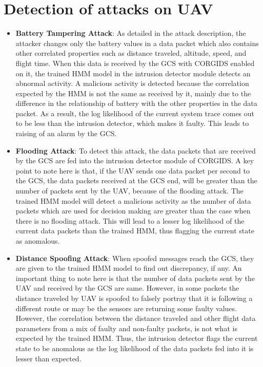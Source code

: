 \section{Detection of attacks on UAV}
\begin{itemize}
\item {\bf Battery Tampering Attack}: As detailed in the attack description, the attacker changes only the battery values in a data packet which also contains other correlated properties such as distance traveled, altitude, speed, and flight time. When this data is received by the GCS with CORGIDS enabled on it, the trained HMM model in the intrusion detector module detects an abnormal activity. A malicious activity is detected because the correlation expected by the HMM is not the same as received by it, mainly due to the difference in the relationship of battery with the other properties in the data packet. As a result, the log likelihood of the current system trace comes out to be less than the intrusion detector, which makes it faulty. This leads to raising of an alarm by the GCS.

\item {\bf Flooding Attack}: To detect this attack, the data packets that are received by the GCS are fed into the intrusion detector module of CORGIDS. A key point to note here is that, if the UAV sends one data packet per second to the GCS, the data packets received at the GCS end, will be greater than the number of packets sent by the UAV, because of the flooding attack. The trained HMM model will detect a malicious activity as the number of data packets which are used for decision making are greater than the case when there is no flooding attack. This will lead to a lesser log likelihood of the current data packets than the trained HMM, thus flagging the current state as anomalous.

\item {\bf Distance Spoofing Attack}: When spoofed messages reach the GCS, they are given to the trained HMM model to find out discrepancy, if any. An important thing to note here is that the number of data packets sent by the UAV and received by the GCS are same. However, in some packets the distance traveled by UAV is spoofed to falsely portray that it is following a different route or may be the sensors are returning some faulty values. However, the correlation between the distance traveled and other flight data parameters from a mix of faulty and non-faulty packets, is not what is expected by the trained HMM. Thus, the intrusion detector flags the current state to be anomalous as the log likelihood of the data packets fed into it is lesser than expected.
\end{itemize}

